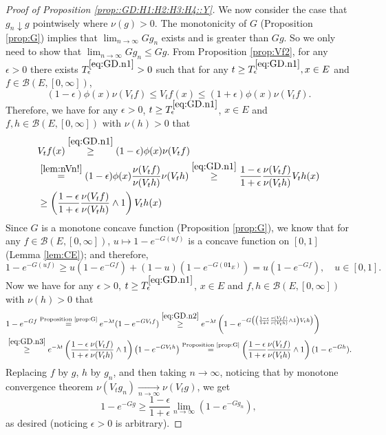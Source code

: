 \documentclass[12pt,a4paper]{amsart}
\numberwithin{equation}{section}
\theoremstyle{plain}
\theoremstyle{definition}
\theoremstyle{remark}
\begin{document}
\begin{proof}[Proof of Proposition \ref{prop::GD:H1:H2:H3:H4::Y}]
	We now consider the case that $g_n \downarrow g$ pointwisely 
	where $\nu(g) > 0$. 
	The monotonicity of $G$ (Proposition \ref{prop:G}) implies that $\lim_{n \to \infty} Gg_n$ exists and is greater 
	than $G g$.
	So we only need to show that $\lim_{n\to \infty} Gg_n \leq Gg$.
	From Proposition \ref{prop:Vf2}, for any $\epsilon>0$ there exists $T_\epsilon^{\eqref{eq:GD.n1}} >0$ such that for any $t\geq T_\epsilon^{\eqref{eq:GD.n1}}, x\in E$ and $f\in \mathcal B(E,[0,\infty])$,
\begin{equation} \label{eq:GD.n1}
	(1-\epsilon)\phi(x) \nu(V_tf)\leq V_tf(x)
	\leq (1+\epsilon)\phi(x) \nu(V_tf).
\end{equation}
	Therefore, we have for any $\epsilon>0$, $t \geq T_\epsilon^{\eqref{eq:GD.n1}}$, $x\in E$ and $f, h\in \mathcal B(E,[0,\infty])$ with $\nu(h) >0$ that
\begin{align}
	&V_tf(x)
	\overset{\eqref{eq:GD.n1}}\geq (1-\epsilon)\phi(x) \nu(V_tf)
	\\& \overset{\eqref{lem:nVn!}}= (1-\epsilon)\phi(x) \frac{\nu(V_tf)}{\nu(V_th)} \nu(V_th)
\overset{\eqref{eq:GD.n1}}\geq \frac{1-\epsilon}{1+\epsilon} \frac{\nu(V_tf)}{\nu(V_th)} V_th(x)
	\\ \label{eq:GD.n2} & \geq \left(\frac{1-\epsilon}{1+\epsilon} \frac{\nu(V_tf)}{\nu(V_th)} \wedge 1\right) V_th(x)
\end{align}
	Since $G$ is a monotone concave function (Proposition \ref{prop:G}), we know that for any $f\in \mathcal B(E,[0,\infty])$, $u \mapsto 1 - e^{-G(uf)}$ is a concave function on $[0,1]$ (Lemma \ref{lem:CE}); and therefore,
\begin{equation} \label{eq:GD.n3}
	1 - e^{- G(uf)}\geq u(1- e^{- Gf}) + (1-u) (1- e^{- G(0  \mathbf 1_E)}) = u(1- e^{- Gf}), \quad u \in [0,1].
\end{equation}
	Now we have for any $\epsilon>0$, $t \geq T_\epsilon^{\eqref{eq:GD.n1}}$, $x\in E$ and $f, h\in \mathcal B(E,[0,\infty])$ with $\nu(h) >0$ that
\begin{align}
	&1 - e^{-Gf}
	\overset{\text{Proposition \ref{prop:G}}}= e^{-\lambda t}(1- e^{- GV_t f})
	\overset{\eqref{eq:GD.n2}}\geq e^{-\lambda t}\left(1- e^{- G\left( \left(\frac{1-\epsilon}{1+\epsilon} \frac{\nu(V_tf)}{\nu(V_th)} \wedge 1\right) V_th\right) }\right)
	\\ &\overset{\eqref{eq:GD.n3}}\geq e^{-\lambda t} \left(\frac{1-\epsilon}{1+\epsilon} \frac{\nu(V_tf)}{\nu(V_th)} \wedge 1 \right) \left(1- e^{- GV_th }\right)
	\overset{\text{Proposition \ref{prop:G}}}= \left(\frac{1-\epsilon}{1+\epsilon} \frac{\nu(V_tf)}{\nu(V_th)} \wedge 1\right) (1 - e^{- Gh}).
\end{align}
	Replacing $f$ by $g$, $h$ by $g_n$, and then taking $n\to \infty$, noticing that by monotone convergence theorem $\nu(V_tg_n) \xrightarrow[n\to \infty]{} \nu(V_tg)$, we get
\begin{equation}
	1 - e^{- Gg} \geq \frac{1 - \epsilon}{1+\epsilon}\lim_{n\to \infty}(1 - e^{- Gg_n}),
\end{equation}
	as desired (noticing $\epsilon > 0$ is arbitrary).
\end{proof}
\end{document}
